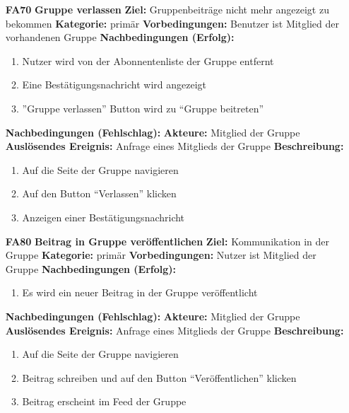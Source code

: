 \documentclass[parskip=full]{scrartcl}
\begin{document}
\begin{itemize}[nosep]
			\item[\textbf{FA70}]\textbf{Gruppe verlassen}
				\newline \textbf{Ziel:} Gruppenbeiträge nicht mehr angezeigt zu bekommen
				\newline \textbf{Kategorie:} primär
				\newline \textbf{Vorbedingungen:} Benutzer ist Mitglied der vorhandenen Gruppe
				\newline \textbf{Nachbedingungen (Erfolg):} 
				\begin{enumerate}[nosep]
					\item Nutzer wird von der Abonnentenliste der Gruppe entfernt
					\item Eine Bestätigungsnachricht wird angezeigt
					\item ”Gruppe verlassen” Button wird zu “Gruppe beitreten” 
				\end{enumerate}
				\textbf{Nachbedingungen (Fehlschlag):}
				\newline \textbf{Akteure:} Mitglied der Gruppe
				\newline \textbf{Auslösendes Ereignis:} Anfrage eines Mitglieds der Gruppe
				\newline \textbf{Beschreibung:}
				\begin{enumerate}[nosep]
					\item Auf die Seite der Gruppe navigieren
					\item Auf den Button “Verlassen” klicken
					\item Anzeigen einer Bestätigungsnachricht\\
				\end{enumerate}
							
			\item[\textbf{FA80}]\textbf{Beitrag in Gruppe veröffentlichen}
				\newline \textbf{Ziel:} Kommunikation in der Gruppe
				\newline \textbf{Kategorie:} primär
				\newline \textbf{Vorbedingungen:} Nutzer ist Mitglied der Gruppe
				\newline \textbf{Nachbedingungen (Erfolg):} 
				\begin{enumerate}[nosep]
					\item Es wird ein neuer Beitrag in der Gruppe veröffentlicht 
				\end{enumerate}
				\textbf{Nachbedingungen (Fehlschlag):}
				\newline \textbf{Akteure:} Mitglied der Gruppe
				\newline \textbf{Auslösendes Ereignis:} Anfrage eines Mitglieds der Gruppe
				\newline \textbf{Beschreibung:}
				\begin{enumerate}[nosep]
					\item Auf die Seite der Gruppe navigieren
					\item Beitrag schreiben und auf den Button “Veröffentlichen” klicken
					\item  Beitrag erscheint im Feed der Gruppe\\
				\end{enumerate}
		

\end{itemize}
\end{document}
